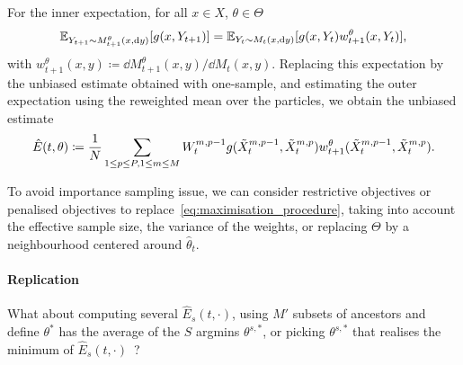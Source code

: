 For the inner expectation, for all $x\in X$, $\theta\in \Theta$
\begin{equation}
    \mathbb{E}_{Y_{t+1}\sim M_{t+1}^{\theta}(x, \mathrm{d} y)}[g(x, Y_{t+1})] = \mathbb{E}_{Y_{t}\sim M_t(x, \mathrm{d} y)} [g(x, Y_{t})  w_{t+1}^{\theta}(x, Y_t)],
\end{equation}
with $w_{t+1}^{\theta}(x, y) \coloneq \dd M_{t+1}^{\theta}(x, y)/\dd M_t(x, y)$.
Replacing this expectation by the unbiased estimate obtained with one-sample, and estimating the outer expectation using the reweighted mean over the particles, we obtain the unbiased estimate
\begin{equation}
    \hat{E}(t, \theta) \coloneq \frac{1}{N}\sum_{1\leq p\leq P, \\
    1\leq m\leq M} W_t^{m, p-1}g(\tilde{X}_t^{m, p-1}, \tilde{X}_t^{m, p}) w_{t+1}^{\theta}(\tilde{X}_t^{m,p-1}, \tilde{X}_t^{m,p}).
\end{equation}

To avoid importance sampling issue, we can consider restrictive objectives or penalised objectives to replace~\eqref{eq:maximisation_procedure}, taking into account the effective sample size, the variance of the weights, or replacing $\Theta$ by a neighbourhood centered around $\hat{\theta}_t$.

\paragraph{Replication}
What about computing several $\hat{E}_s(t, \cdot)$, using $M'$ subsets of ancestors and define $\theta^{*}$ has the average of the $S$ argmins $\theta^{s,*}$, or picking $\theta^{s,*}$ that realises the minimum of $\hat{E}_s(t, \cdot)$~\citep{doi:10.1137/S1052623499363220}?

